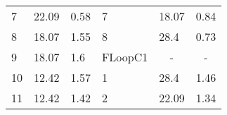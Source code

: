 \documentclass[oneside,onecolumn]{article}
\begin{document}
\begin{table}[]
\begin{tabular}{llllll}
7                                                                                   & 22.09                                                                                                   & 0.58                                                                                   & 7                                                                                    & 18.07                                                                                                   & 0.84                                                                                   \\
8                                                                                   & 18.07                                                                                                   & 1.55                                                                                   & 8                                                                                    & 28.4                                                                                                    & 0.73                                                                                   \\
9                                                                                   & 18.07                                                                                                   & 1.6                                                                                    & \multicolumn{1}{c}{FLoopC1}                                                          & \multicolumn{1}{c}{-}                                                                                   & \multicolumn{1}{c}{-}                                                                  \\
10                                                                                  & 12.42                                                                                                   & 1.57                                                                                   & 1                                                                                    & 28.4                                                                                                    & 1.46                                                                                   \\
11                                                                                  & 12.42                                                                                                   & 1.42                                                                                   & 2                                                                                    & 22.09                                                                                                   & 1.34                                                                                   \\

\end{tabular}
\end{table}
\end{document}
